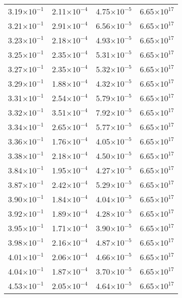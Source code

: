 \documentclass{aa}
\begin{document}
{\begin{longtable}{c|c|c|c}
3.19$\times 10^{-1}$ & 2.11$\times 10^{-4}$ & 4.75$\times 10^{-5}$ & 6.65$\times 10^{17}$  \\
3.21$\times 10^{-1}$ & 2.91$\times 10^{-4}$ & 6.56$\times 10^{-5}$ & 6.65$\times 10^{17}$  \\
3.23$\times 10^{-1}$ & 2.18$\times 10^{-4}$ & 4.93$\times 10^{-5}$ & 6.65$\times 10^{17}$  \\
3.25$\times 10^{-1}$ & 2.35$\times 10^{-4}$ & 5.31$\times 10^{-5}$ & 6.65$\times 10^{17}$  \\
3.27$\times 10^{-1}$ & 2.35$\times 10^{-4}$ & 5.32$\times 10^{-5}$ & 6.65$\times 10^{17}$  \\
3.29$\times 10^{-1}$ & 1.88$\times 10^{-4}$ & 4.32$\times 10^{-5}$ & 6.65$\times 10^{17}$  \\
3.31$\times 10^{-1}$ & 2.54$\times 10^{-4}$ & 5.79$\times 10^{-5}$ & 6.65$\times 10^{17}$  \\
3.32$\times 10^{-1}$ & 3.51$\times 10^{-4}$ & 7.92$\times 10^{-5}$ & 6.65$\times 10^{17}$  \\
3.34$\times 10^{-1}$ & 2.65$\times 10^{-4}$ & 5.77$\times 10^{-5}$ & 6.65$\times 10^{17}$  \\
3.36$\times 10^{-1}$ & 1.76$\times 10^{-4}$ & 4.05$\times 10^{-5}$ & 6.65$\times 10^{17}$  \\
3.38$\times 10^{-1}$ & 2.18$\times 10^{-4}$ & 4.50$\times 10^{-5}$ & 6.65$\times 10^{17}$  \\
3.84$\times 10^{-1}$ & 1.95$\times 10^{-4}$ & 4.27$\times 10^{-5}$ & 6.65$\times 10^{17}$  \\
3.87$\times 10^{-1}$ & 2.42$\times 10^{-4}$ & 5.29$\times 10^{-5}$ & 6.65$\times 10^{17}$  \\
3.90$\times 10^{-1}$ & 1.84$\times 10^{-4}$ & 4.04$\times 10^{-5}$ & 6.65$\times 10^{17}$  \\
3.92$\times 10^{-1}$ & 1.89$\times 10^{-4}$ & 4.28$\times 10^{-5}$ & 6.65$\times 10^{17}$  \\
3.95$\times 10^{-1}$ & 1.71$\times 10^{-4}$ & 3.90$\times 10^{-5}$ & 6.65$\times 10^{17}$  \\
3.98$\times 10^{-1}$ & 2.16$\times 10^{-4}$ & 4.87$\times 10^{-5}$ & 6.65$\times 10^{17}$  \\
4.01$\times 10^{-1}$ & 2.06$\times 10^{-4}$ & 4.66$\times 10^{-5}$ & 6.65$\times 10^{17}$  \\
4.04$\times 10^{-1}$ & 1.87$\times 10^{-4}$ & 3.70$\times 10^{-5}$ & 6.65$\times 10^{17}$  \\
4.53$\times 10^{-1}$ & 2.05$\times 10^{-4}$ & 4.64$\times 10^{-5}$ & 6.65$\times 10^{17}$  \\

\end{longtable}}
\end{document}
